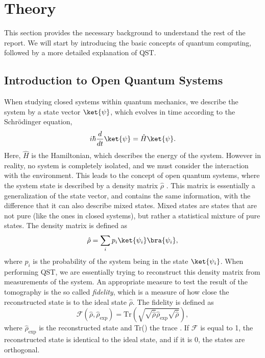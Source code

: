 \documentclass[a4paper,12pt]{article}
\begin{document}
\section{Theory}
This section provides the necessary background to understand the rest of the report. We will start by introducing the basic concepts of quantum computing, followed by a more detailed explanation of QST.
\subsection{Introduction to Open Quantum Systems}
When studying closed systems within quantum mechanics, we describe the system by a state vector $\ket{\psi}$, which evolves in time according to the Schrödinger equation,
\begin{equation}
    i\hbar \frac{d}{dt} \ket{\psi} = \hat{H} \ket{\psi}.
\end{equation}
Here, $\hat{H}$ is the Hamiltonian, which describes the energy of the system. However in reality, no system is completely isolated, and we must consider the interaction with the environment. This leads to the concept of open quantum systems, where the system state is described by a density matrix $\hat{\rho}$ \cite{nielsen_chuang}. This matrix is essentially a generalization of the state vector, and contains the same information, with the difference that it can also describe mixed states. Mixed states are states that are not pure (like the ones in closed systems), but rather a statistical mixture of pure states. The density matrix is defined as
\begin{equation}
    \hat{\rho} = \sum_i p_i \ket{\psi_i} \bra{\psi_i},
\end{equation}
where $p_i$ is the probability of the system being in the state $\ket{\psi_i}$. When performing QST, we are essentially trying to reconstruct this density matrix from measurements of the system. An appropriate measure to test the result of the tomography is the so called \textit{fidelity}, which is a measure of how close the reconstructed state is to the ideal state $\hat{\rho}$. The fidelity is defined as
\begin{equation} \label{fid}
    \mathcal{F}(\hat{\rho}, \hat{\rho}_{\text{exp}}) = \text{Tr}\left(\sqrt{\sqrt{\hat{\rho}}\hat{\rho}_{\text{exp}}\sqrt{\hat{\rho}}}\right ),
\end{equation}
where $\hat{\rho}_{\text{exp}}$ is the reconstructed state and Tr() the trace \cite{nielsen_chuang}. If $\mathcal{F}$ is equal to 1, the reconstructed state is identical to the ideal state, and if it is 0, the states are orthogonal.
\end{document}
